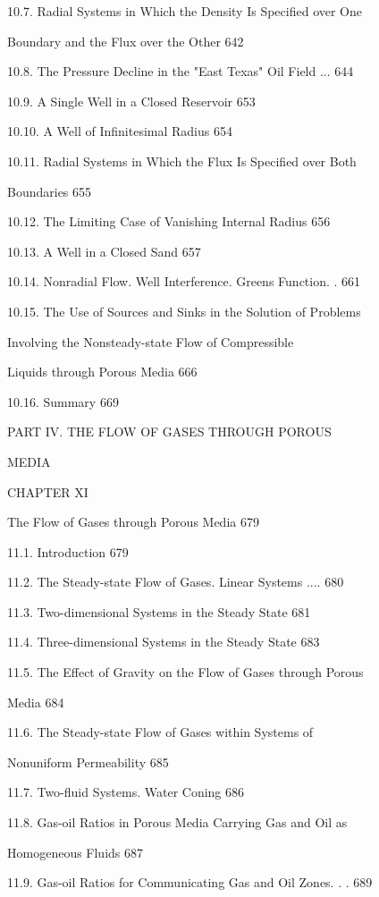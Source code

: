 \documentclass[
  11pt,
]{article}
\begin{document}
10.7. Radial Systems in Which the Density Is Specified over One \par
Boundary and the Flux over the Other 642 \par
10.8. The Pressure Decline in the "East Texas" Oil Field ... 644 \par
10.9. A Single Well in a Closed Reservoir 653 \par
10.10. A Well of Infinitesimal Radius 654 \par
10.11. Radial Systems in Which the Flux Is Specified over Both \par
Boundaries 655 \par
10.12. The Limiting Case of Vanishing Internal Radius 656 \par
10.13. A Well in a Closed Sand 657 \par
10.14. Nonradial Flow. Well Interference. Green\textquotesingle s Function. . 661 \par
10.15. The Use of Sources and Sinks in the Solution of Problems \par
Involving the Nonsteady-state Flow of Compressible \par
Liquids through Porous Media 666 \par
10.16. Summary 669 \par
PART IV. THE FLOW OF GASES THROUGH POROUS \par
MEDIA \par
CHAPTER XI \par
The Flow of Gases through Porous Media 679 \par
11.1. Introduction 679 \par
11.2. The Steady-state Flow of Gases. Linear Systems .... 680 \par
11.3. Two-dimensional Systems in the Steady State 681 \par
11.4. Three-dimensional Systems in the Steady State 683 \par
11.5. The Effect of Gravity on the Flow of Gases through Porous \par
Media 684 \par
11.6. The Steady-state Flow of Gases within Systems of  \par
Nonuniform Permeability 685 \par
11.7. Two-fluid Systems. Water Coning 686 \par
11.8. Gas-oil Ratios in Porous Media Carrying Gas and Oil as \par
Homogeneous Fluids 687 \par
11.9. Gas-oil Ratios for Communicating Gas and Oil Zones. . . 689 \par
\end{document}
